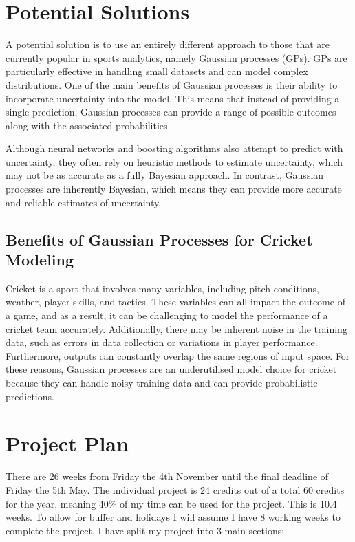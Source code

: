 \documentclass[12pt,a4paper]{report}
\theoremstyle{definition}
\begin{document}
\section{Potential Solutions}

A potential solution is to use an entirely different approach to those that are currently popular in sports analytics, namely Gaussian processes (GPs).
GPs are particularly effective in handling small datasets and can model complex distributions. 
One of the main benefits of Gaussian processes is their ability to incorporate uncertainty into the model. 
This means that instead of providing a single prediction, Gaussian processes can provide a range of possible outcomes along with the associated probabilities. 

Although neural networks and boosting algorithms also attempt to predict with uncertainty, they often rely on heuristic methods to estimate uncertainty, which may not be as accurate as a fully Bayesian approach. 
In contrast, Gaussian processes are inherently Bayesian, which means they can provide more accurate and reliable estimates of uncertainty.

\subsection{Benefits of Gaussian Processes for Cricket Modeling}

Cricket is a sport that involves many variables, including pitch conditions, weather, player skills, and tactics. 
These variables can all impact the outcome of a game, and as a result, it can be challenging to model the performance of a cricket team accurately. 
Additionally, there may be inherent noise in the training data, such as errors in data collection or variations in player performance.
Furthermore, outputs can constantly overlap the same regions of input space.
For these reasons, Gaussian processes are an underutilised model choice for cricket because they can handle noisy training data and can provide probabilistic predictions.

\section{Project Plan}

There are 26 weeks from Friday the 4th November until the final deadline of Friday the 5th May. 
The individual project is 24 credits out of a total 60 credits for the year, meaning 40\% of my time can be used for the project. 
This is 10.4 weeks. 
To allow for buffer and holidays I will assume I have 8 working weeks to complete the project. 
I have split my project into 3 main sections:
\end{document}
